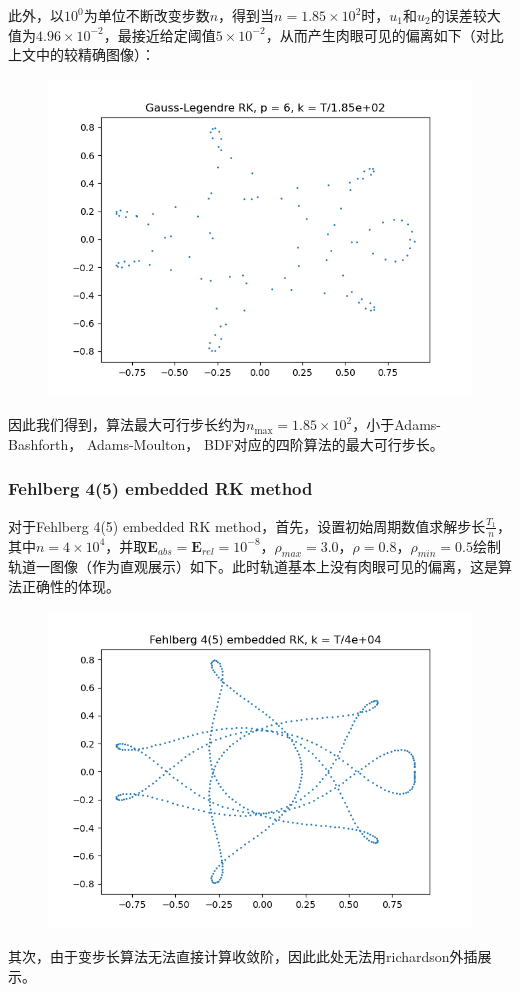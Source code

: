 \documentclass{ctexart}
\begin{document}
\begin{sloppypar}
此外，以$10^0$为单位不断改变步数$n$，得到当$n = 1.85 \times 10^2$时，$u_1$和$u_2$的误差较大值为$4.96 \times 10^{-2}$，最接近给定阈值$5 \times 10^{-2}$，从而产生肉眼可见的偏离如下（对比上文中的较精确图像）：
\begin{figure}[H]
\centering
\includegraphics[scale = 0.45]{./report_src/Figure_73.png}
\end{figure}
因此我们得到，算法最大可行步长约为$n_{\max} = 1.85 \times 10^2$，小于Adams-Bashforth， Adams-Moulton， BDF对应的四阶算法的最大可行步长。

\subsubsection{Fehlberg 4(5) embedded RK method}
对于Fehlberg 4(5) embedded RK method，首先，设置初始周期数值求解步长$\frac{T_1}{n}$，其中$n = 4 \times 10^4$，并取$\mathbf{E}_{abs}=\mathbf{E}_{rel}=10^{-8}$，$\rho_{max}=3.0$，$\rho = 0.8$，$\rho_{min} = 0.5$绘制轨道一图像（作为直观展示）如下。此时轨道基本上没有肉眼可见的偏离，这是算法正确性的体现。
\begin{figure}[H]
\centering
\includegraphics[scale = 0.45]{./report_src/Figure_74.png}
\end{figure}
其次，由于变步长算法无法直接计算收敛阶，因此此处无法用richardson外插展示。


\end{sloppypar}
\end{document}
